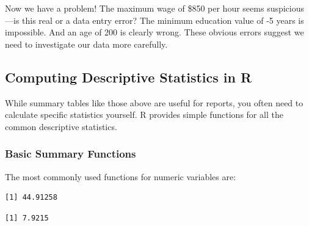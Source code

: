 \documentclass[
  letterpaper,
  DIV=11,
  numbers=noendperiod]{scrreprt}
\newenvironment{Shaded}{\begin{snugshade}}{\end{snugshade}}
\newcommand{\CommentTok}[1]{\textcolor[rgb]{0.37,0.37,0.37}{#1}}
\newcommand{\FunctionTok}[1]{\textcolor[rgb]{0.28,0.35,0.67}{#1}}
\newcommand{\NormalTok}[1]{\textcolor[rgb]{0.00,0.23,0.31}{#1}}
\newcommand{\SpecialCharTok}[1]{\textcolor[rgb]{0.37,0.37,0.37}{#1}}
\begin{document}
Now we have a problem! The maximum wage of \$850 per hour seems
suspicious---is this real or a data entry error? The minimum education
value of -5 years is impossible. And an age of 200 is clearly wrong.
These obvious errors suggest we need to investigate our data more
carefully.

\subsection{Computing Descriptive Statistics in
R}\label{computing-descriptive-statistics-in-r}

While summary tables like those above are useful for reports, you often
need to calculate specific statistics yourself. R provides simple
functions for all the common descriptive statistics.

\subsubsection{Basic Summary Functions}\label{basic-summary-functions}

The most commonly used functions for numeric variables are:

\begin{Shaded}
\end{Shaded}

\begin{verbatim}
[1] 44.91258
\end{verbatim}

\begin{Shaded}
\end{Shaded}

\begin{verbatim}
[1] 7.9215
\end{verbatim}

\begin{Shaded}
\end{Shaded}
\end{document}
